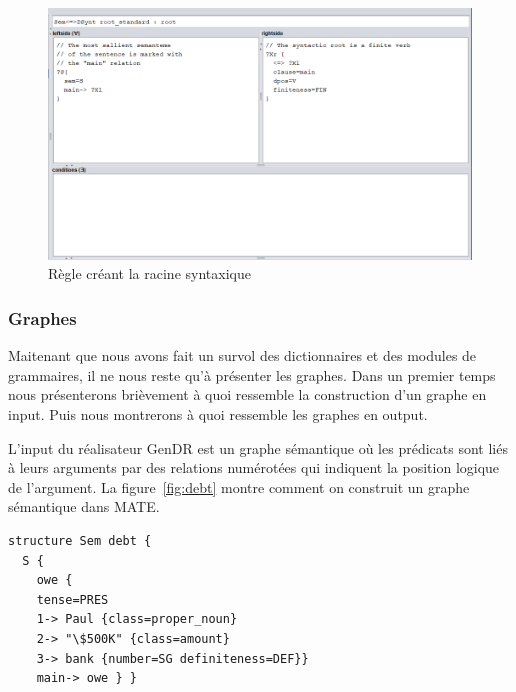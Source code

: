 \begin{figure}[htb]
	\centering
	\includegraphics[width=1\textwidth, trim = {0cm 0cm 0cm 0cm},clip]{ch3/figs/grammaire.png}
	\caption{Règle créant la racine syntaxique}
	\label{fig:root}
\end{figure}


\subsubsection{Graphes}\label{entree-sortie}

Maitenant que nous avons fait un survol des dictionnaires et des modules de grammaires, il ne nous reste qu'à présenter les graphes. Dans un premier temps nous présenterons brièvement à quoi ressemble la construction d'un graphe en input. Puis nous montrerons à quoi ressemble les graphes en output.

L'input du réalisateur GenDR est un graphe sémantique \citep{mel2012semantics} où les prédicats sont liés à leurs arguments par des relations numérotées qui indiquent la position logique de l'argument. La figure~\ref{fig:debt} montre comment on construit un graphe sémantique dans MATE.

\begin{minipage}{\linewidth}
\begin{lstlisting}[language=XML, caption = Input sémantique, label=fig:debt]
structure Sem debt {
  S {
    owe {
    tense=PRES
    1-> Paul {class=proper_noun}
    2-> "\$500K" {class=amount}
    3-> bank {number=SG definiteness=DEF}}
    main-> owe } }
\end{lstlisting}
\end{minipage}

